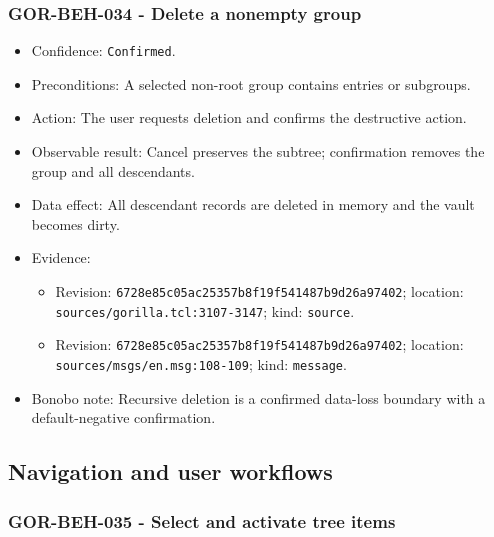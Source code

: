 \documentclass[
  letterpaper,
]{article}
\newcommand{\passthrough}[1]{#1}
\providecommand{\tightlist}{%
  \setlength{\itemsep}{0pt}\setlength{\parskip}{0pt}}
\begin{document}
\subsubsection{GOR-BEH-034 - Delete a nonempty group}\label{gor-beh-034---delete-a-nonempty-group}

\begin{itemize}
\tightlist
\item
  Confidence: \passthrough{\lstinline!Confirmed!}.
\item
  Preconditions: A selected non-root group contains entries or subgroups.
\item
  Action: The user requests deletion and confirms the destructive action.
\item
  Observable result: Cancel preserves the subtree; confirmation removes the group and all descendants.
\item
  Data effect: All descendant records are deleted in memory and the vault becomes dirty.
\item
  Evidence:

  \begin{itemize}
  \tightlist
  \item
    Revision: \nolinkurl{6728e85c05ac25357b8f19f541487b9d26a97402}; location: \nolinkurl{sources/gorilla.tcl:3107-3147};
    kind: \passthrough{\lstinline!source!}.
  \item
    Revision: \nolinkurl{6728e85c05ac25357b8f19f541487b9d26a97402}; location: \nolinkurl{sources/msgs/en.msg:108-109};
    kind: \passthrough{\lstinline!message!}.
  \end{itemize}
\item
  Bonobo note: Recursive deletion is a confirmed data-loss boundary with a default-negative confirmation.
\end{itemize}

\subsection{Navigation and user workflows}\label{navigation-and-user-workflows}

\subsubsection{GOR-BEH-035 - Select and activate tree items}\label{gor-beh-035---select-and-activate-tree-items}
\end{document}
